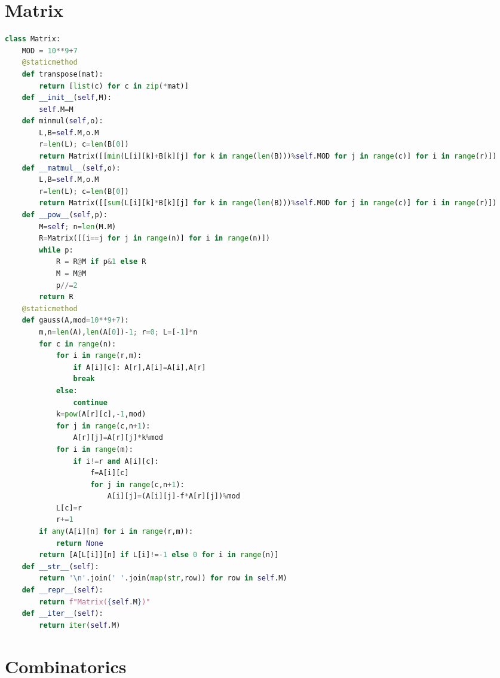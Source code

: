 \documentclass[10pt,landscape, a4paper]{article}
\begin{document}
\begin{multicols*}{3}
\section{Matrix}
\begin{lstlisting}[language=Python]
class Matrix:
    MOD = 10**9+7
    @staticmethod
    def transpose(mat):
        return [list(c) for c in zip(*mat)]
    def __init__(self,M):
        self.M=M
    def minmul(self,o):
        L,B=self.M,o.M
        r=len(L); c=len(B[0])
        return Matrix([[min(L[i][k]+B[k][j] for k in range(len(B)))%self.MOD for j in range(c)] for i in range(r)])
    def __matmul__(self,o):
        L,B=self.M,o.M
        r=len(L); c=len(B[0])
        return Matrix([[sum(L[i][k]*B[k][j] for k in range(len(B)))%self.MOD for j in range(c)] for i in range(r)])
    def __pow__(self,p):
        M=self; n=len(M.M)
        R=Matrix([[i==j for j in range(n)] for i in range(n)])
        while p:
            R = R@M if p&1 else R
            M = M@M
            p//=2
        return R
    @staticmethod
    def gauss(A,mod=10**9+7):
        m,n=len(A),len(A[0])-1; r=0; L=[-1]*n
        for c in range(n):
            for i in range(r,m):
                if A[i][c]: A[r],A[i]=A[i],A[r]
                break
            else:
                continue
            k=pow(A[r][c],-1,mod)
            for j in range(c,n+1):
                A[r][j]=A[r][j]*k%mod
            for i in range(m):
                if i!=r and A[i][c]:
                    f=A[i][c]
                    for j in range(c,n+1):
                        A[i][j]=(A[i][j]-f*A[r][j])%mod
            L[c]=r
            r+=1
        if any(A[i][n] for i in range(r,m)):
            return None
        return [A[L[i]][n] if L[i]!=-1 else 0 for i in range(n)]
    def __str__(self):
        return '\n'.join(' '.join(map(str,row)) for row in self.M)
    def __repr__(self):
        return f"Matrix({self.M})"
    def __iter__(self):
        return iter(self.M)
\end{lstlisting}

\section{Combinatorics}
\begin{lstlisting}[language=Python]


\end{lstlisting}
\end{multicols*}
\end{document}
